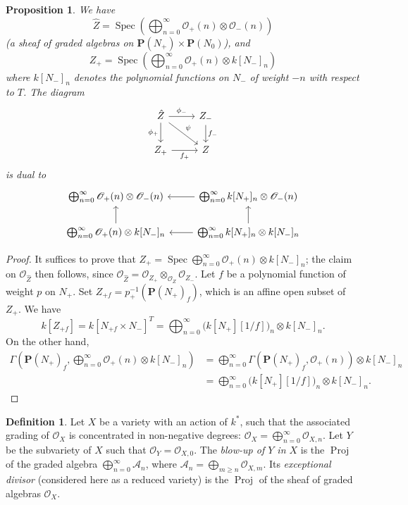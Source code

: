 \documentclass{article}
\theoremstyle{plain}
\newtheorem*{proposition}{Proposition}
\theoremstyle{definition}
\newtheorem*{definition}{Definition}
\newcommand{\scr}[1]{{\mathscr{#1}}}
\newcommand{\PP}{\mathbf{P}}
\DeclareMathOperator{\Spec}{Spec}
\DeclareMathOperator{\Proj}{Proj}
\renewcommand{\geq}{\geqslant}
\newcommand{\oldpage}[1]{\marginpar{\footnotesize$\Big\vert$ \textit{p.~#1}}}
\begin{document}
\begin{proposition}
  We have
  \[
    \hat{Z} = \Spec \left( \bigoplus_{n=0}^\infty \scr{O}_+(n)\otimes\scr{O}_-(n) \right)
  \]
  (a sheaf of graded algebras on $\PP(N_+)\times\PP(N_0)$), and
  \[
    Z_+ = \Spec \left( \bigoplus_{n=0}^\infty \scr{O}_+(n)\otimes k[N_-]_n \right)
  \]
  where $k[N_-]_n$ denotes the polynomial functions on $N_-$ of weight $-n$ with respect to $T$.
  The diagram
  \[
    \begin{tikzcd}
      \hat{Z} \rar["\phi_-"] \dar[swap,"\phi_+"] \drar["\psi"]
      & Z_- \dar["f_-"]
    \\Z_+ \rar[swap,"f_+"]
      & Z
    \end{tikzcd}
  \]
\oldpage{519}
  is dual to
  \[
    \begin{tikzcd}
      \bigoplus_{n=0}^\infty\scr{O}_+(n)\otimes\scr{O}_-(n)
      & \bigoplus_{n=0}^\infty k[N_+]_n\otimes\scr{O}_-(n) \lar
    \\\bigoplus_{n=0}^\infty\scr{O}_+(n)\otimes k[N_-]_n \uar
      & \bigoplus_{n=0}^\infty k[N_+]_n\otimes k[N_-]_n \uar \lar
    \end{tikzcd}
  \]
\end{proposition}

\begin{proof}
  It suffices to prove that $Z_+=\Spec\bigoplus_{n=0}^\infty\scr{O}_+(n)\otimes k[N_-]_n$;
  the claim on $\scr{O}_{\hat{Z}}$ then follows, since $\scr{O}_{\hat{Z}}=\scr{O}_{Z_+}\otimes_{\scr{O}_Z}\scr{O}_{Z_-}$.
  Let $f$ be a polynomial function of weight $p$ on $N_+$.
  Set $Z_{+f}=p_+^{-1}(\PP(N_+)_f)$, which is an affine open subset of $Z_+$.
  We have
  \[
    k[Z_{+f}]
    = k[N_{+f}\times N_-]^T
    = \bigoplus_{n=0}^\infty\big(k[N_+][1/f]\big)_n\otimes k[N_-]_n.
  \]
  On the other hand,
  \[
    \begin{aligned}
      \Gamma\left(\PP(N_+)_f, \bigoplus_{n=0}^\infty\scr{O}_+(n)\otimes k[N_-]_n\right)
      &= \bigoplus_{n=0}^\infty\Gamma\left(\PP(N_+)_f,\scr{O}_+(n)\right)\otimes k[N_-]_n
    \\&= \bigoplus_{n=0}^\infty\big(k[N_+][1/f]\big)_n\otimes k[N_-]_n.
    \end{aligned}
  \]
\end{proof}

\begin{definition}
  Let $X$ be a variety with an action of $k^*$, such that the associated grading of $\scr{O}_X$ is concentrated in non-negative degrees: $\scr{O}_X=\bigoplus_{n=0}^\infty\scr{O}_{X,n}$.
  Let $Y$ be the subvariety of $X$ such that $\scr{O}_Y=\scr{O}_{X,0}$.
  The \emph{blow-up of $Y$ in $X$} is the $\Proj$ of the graded algebra $\bigoplus_{n=0}^\infty\mathcal{A}_n$, where $\mathcal{A}_n=\bigoplus_{m\geq n}\scr{O}_{X,m}$.
  Its \emph{exceptional divisor} (considered here as a reduced variety) is the $\Proj$ of the sheaf of graded algebras $\scr{O}_X$.
\end{definition}
\end{document}
